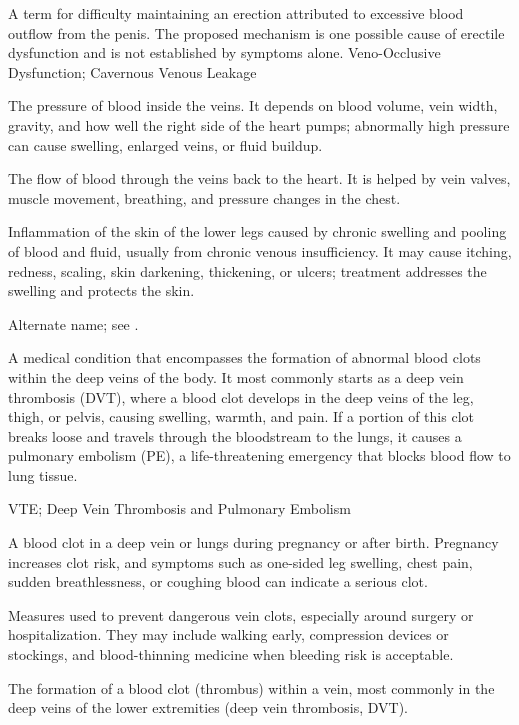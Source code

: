  A term for difficulty maintaining an erection attributed to excessive blood outflow from the penis. The proposed mechanism is one possible cause of erectile dysfunction and is not established by symptoms alone.
\synonyms
Veno-Occlusive Dysfunction; Cavernous Venous Leakage

 The pressure of blood inside the veins. It depends on blood volume, vein width, gravity, and how well the right side of the heart pumps; abnormally high pressure can cause swelling, enlarged veins, or fluid buildup.

 The flow of blood through the veins back to the heart. It is helped by vein valves, muscle movement, breathing, and pressure changes in the chest.

 Inflammation of the skin of the lower legs caused by chronic swelling and pooling of blood and fluid, usually from chronic venous insufficiency. It may cause itching, redness, scaling, skin darkening, thickening, or ulcers; treatment addresses the swelling and protects the skin.

 Alternate name; see .

 A medical condition that encompasses the formation of abnormal blood clots within the deep veins of the body. It most commonly starts as a deep vein thrombosis (DVT), where a blood clot develops in the deep veins of the leg, thigh, or pelvis, causing swelling, warmth, and pain. If a portion of this clot breaks loose and travels through the bloodstream to the lungs, it causes a pulmonary embolism (PE), a life-threatening emergency that blocks blood flow to lung tissue.

\synonyms
VTE; Deep Vein Thrombosis and Pulmonary Embolism

 A blood clot in a deep vein or lungs during pregnancy or after birth. Pregnancy increases clot risk, and symptoms such as one-sided leg swelling, chest pain, sudden breathlessness, or coughing blood can indicate a serious clot.

 Measures used to prevent dangerous vein clots, especially around surgery or hospitalization. They may include walking early, compression devices or stockings, and blood-thinning medicine when bleeding risk is acceptable.

 The formation of a blood clot (thrombus) within a vein, most commonly in the deep veins
of the lower extremities (deep vein thrombosis, DVT).

